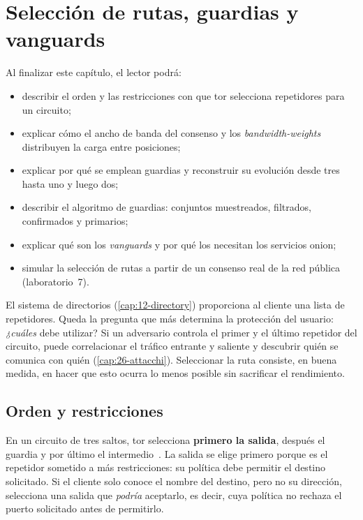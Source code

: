 \chapter{Selección de rutas, guardias y vanguards}\label{cap:13-percorso}

\begin{obiettivi}
Al finalizar este capítulo, el lector podrá:
\begin{itemize}[nosep]
  \item describir el orden y las restricciones con que tor selecciona repetidores para un circuito;
  \item explicar cómo el ancho de banda del consenso y los \emph{bandwidth-weights} distribuyen la carga entre posiciones;
  \item explicar por qué se emplean guardias y reconstruir su evolución desde tres hasta uno y luego dos;
  \item describir el algoritmo de guardias: conjuntos muestreados, filtrados, confirmados y primarios;
  \item explicar qué son los \emph{vanguards} y por qué los necesitan los servicios onion;
  \item simular la selección de rutas a partir de un consenso real de la red pública (laboratorio~7).
\end{itemize}
\end{obiettivi}

El sistema de directorios (\cref{cap:12-directory}) proporciona al cliente una lista de repetidores. Queda la pregunta que más determina la protección del usuario: \emph{¿cuáles} debe utilizar? Si un adversario controla el primer y el último repetidor del circuito, puede correlacionar el tráfico entrante y saliente y descubrir quién se comunica con quién (\cref{cap:26-attacchi}). Seleccionar la ruta consiste, en buena medida, en hacer que esto ocurra lo menos posible sin sacrificar el rendimiento.

\section{Orden y restricciones}\label{sec:percorso-vincoli}

En un circuito de tres saltos, tor selecciona \textbf{primero la salida}, después el guardia y por último el intermedio~. La salida se elige primero porque es el repetidor sometido a más restricciones: su política debe permitir el destino solicitado. Si el cliente solo conoce el nombre del destino, pero no su dirección, selecciona una salida que \emph{podría} aceptarlo, es decir, cuya política no rechaza el puerto solicitado antes de permitirlo.


